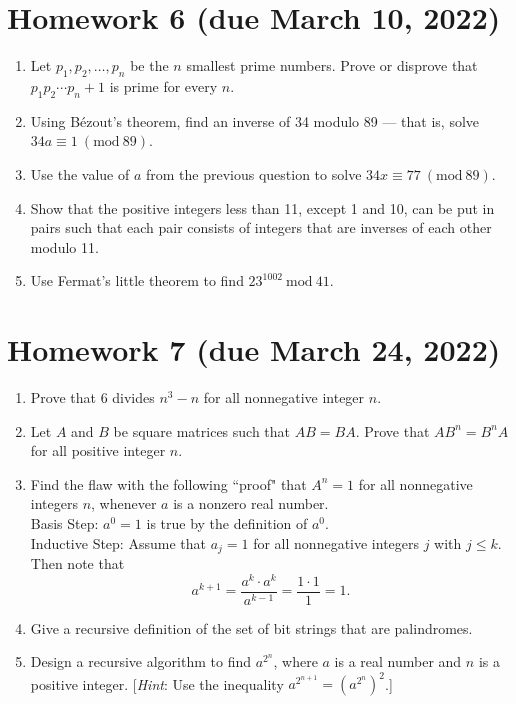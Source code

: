 \documentclass[letterpaper, 12pt]{article}
\newcommand{\PMod}[1]{\ (\mathrm{mod}\ #1)}
\newcommand{\Mod}[1]{\ \mathrm{mod}\ #1}
\begin{document}
\section*{Homework 6 (due March 10, 2022)}

\begin{enumerate}
    \item Let $p_1, p_2, \ldots, p_n$ be the $n$ smallest prime numbers. Prove or disprove that $p_1p_2 \cdots p_n + 1$ is prime for every $n$.
    \item Using B\'{e}zout's theorem, find an inverse of 34 modulo 89 --- that is, solve $34a \equiv 1 \PMod{89}$.
    \item Use the value of $a$ from the previous question to solve $34x \equiv 77 \PMod{89}$.
    \item Show that the positive integers less than 11, except 1 and 10, can be put in pairs such that each pair consists of integers that are inverses of each other modulo 11.
    \item Use Fermat's little theorem to find $23^{1002} \Mod{41}$.
\end{enumerate}

\section*{Homework 7 (due March 24, 2022)}

\begin{enumerate}
    \item Prove that 6 divides $n^3 - n$ for all nonnegative integer $n$.
    \item Let $A$ and $B$ be square matrices such that $AB = BA$. Prove that $AB^n = B^nA$ for all positive integer $n$.
    \item Find the flaw with the following ``proof" that $A^n = 1$ for all nonnegative integers $n$, whenever $a$ is a nonzero real number.\\
    Basis Step: $a^0 = 1$ is true by the definition of $a^0$.\\
    Inductive Step: Assume that $a_j = 1$ for all nonnegative integers $j$ with $j \leq k$. Then note that
    \[a^{k+1} = \frac{a^k \cdot a^k}{a^{k-1}} = \frac{1 \cdot 1}{1} = 1.\]
    \item Give a recursive definition of the set of bit strings that are palindromes.
    \item Design a recursive algorithm to find $a^{2^n}$, where $a$ is a real number and $n$ is a positive integer. [\textit{Hint}: Use the inequality $a^{2^{n+1}} = (a^{2^n})^2$.]
\end{enumerate}
\end{document}
